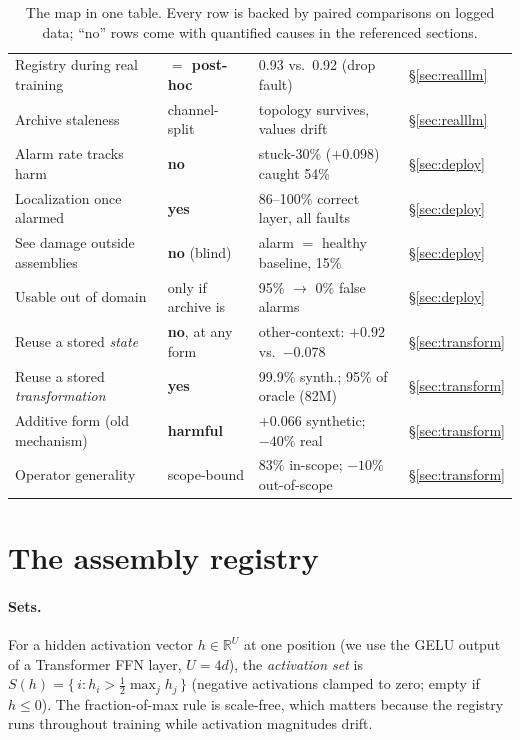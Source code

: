 \documentclass[11pt]{article}
\begin{document}
\begin{table}[t]
\begin{tabular}{@{}llll@{}}
Registry during real training & \textbf{$=$ post-hoc} & 0.93 vs.\ 0.92 (drop fault) & \S\ref{sec:realllm} \\
Archive staleness & channel-split & topology survives, values drift & \S\ref{sec:realllm} \\
\midrule
Alarm rate tracks harm & \textbf{no} & stuck-30\% ($+0.098$) caught 54\% & \S\ref{sec:deploy} \\
Localization once alarmed & \textbf{yes} & 86--100\% correct layer, all faults & \S\ref{sec:deploy} \\
See damage outside assemblies & \textbf{no} (blind) & alarm $=$ healthy baseline, 15\% & \S\ref{sec:deploy} \\
Usable out of domain & only if archive is & 95\% $\rightarrow$ 0\% false alarms & \S\ref{sec:deploy} \\
\midrule
Reuse a stored \emph{state} & \textbf{no}, at any form & other-context: $+0.92$ vs.\ $-0.078$ & \S\ref{sec:transform} \\
Reuse a stored \emph{transformation} & \textbf{yes} & 99.9\% synth.; 95\% of oracle (82M) & \S\ref{sec:transform} \\
Additive form (old mechanism) & \textbf{harmful} & $+0.066$ synthetic; $-40\%$ real & \S\ref{sec:transform} \\
Operator generality & scope-bound & 83\% in-scope; $-10\%$ out-of-scope & \S\ref{sec:transform} \\
\bottomrule
\end{tabular}
\caption{The map in one table. Every row is backed by paired comparisons on
logged data; ``no'' rows come with quantified causes in the referenced
sections.}
\label{tab:map}
\end{table}

\section{The assembly registry}
\label{sec:method}

\paragraph{Sets.} For a hidden activation vector $h \in \mathbb{R}^U$ at one
position (we use the GELU output of a Transformer FFN layer, $U = 4d$), the
\emph{activation set} is $S(h) = \{\,i : h_i > \tfrac{1}{2}\max_j h_j\,\}$
(negative activations clamped to zero; empty if $h \le 0$). The
fraction-of-max rule is scale-free, which matters because the registry runs
throughout training while activation magnitudes drift.
\end{document}
